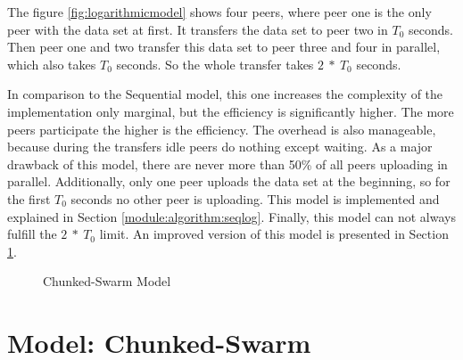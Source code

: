 The figure \ref{fig:logarithmicmodel} shows four peers, where peer one is the only peer with the data set at first. It transfers the data set to peer two in $T_0$ seconds. Then peer one and two transfer this data set to peer three and four in parallel, which also takes $T_0$ seconds. So the whole transfer takes $2\:*\:T_0$ seconds.

In comparison to the Sequential model, this one increases the complexity of the implementation only marginal, but the efficiency is significantly higher. The more peers participate the higher is the efficiency. The overhead is also manageable, because during the transfers idle peers do nothing except waiting. As a major drawback of this model, there are never more than 50\% of all peers uploading in parallel. Additionally, only one peer uploads the data set at the beginning, so for the first $T_0$ seconds no other peer is uploading. This model is implemented and explained in Section \ref{module:algorithm:seqlog}. Finally, this model can not always fulfill the $2\:*\:T_0$ limit. An improved version of this model is presented in Section \ref{theory:model:chunkedswarm}.

\vfill

\begin{figure}[t]
	\begin{center}
	 	\hspace{0.25\textwidth}

		\caption{Chunked-Swarm Model}
	\end{center}
\end{figure}

\pagebreak

\section{Model: Chunked-Swarm}
\label{theory:model:chunkedswarm}

